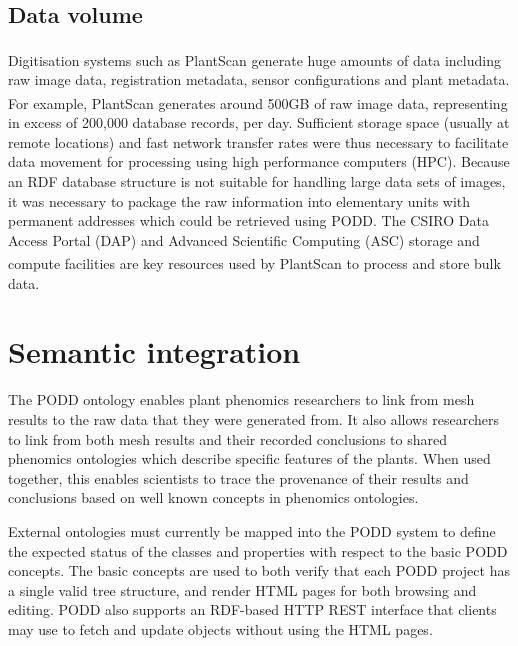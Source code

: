 \documentclass{llncs}
\begin{document}
\subsection{Data volume}
Digitisation systems such as PlantScan\textsuperscript{\texttrademark} generate
huge amounts of data including
raw image data, registration metadata, sensor configurations and plant metadata.
For example, PlantScan\textsuperscript{\texttrademark} generates around 500GB of
raw image data, representing
in excess of 200,000 database records, per day. Sufficient storage space
(usually at remote locations) and fast network transfer rates were thus
necessary to facilitate data movement for processing using high performance
computers (HPC). Because an RDF database structure is not suitable for handling
large data sets of images, it was necessary to package the raw information into
elementary units with permanent addresses which could be retrieved using PODD. 
The CSIRO Data Access Portal (DAP) \cite{DAP} and Advanced
Scientific Computing (ASC) storage and compute facilities \cite{ASC} are key
resources used by PlantScan\textsuperscript{\texttrademark} to
process and store bulk data.






\section{Semantic integration}
The PODD ontology enables plant phenomics researchers to link from mesh results
to the raw data that they were generated from. It also allows researchers to
link from both mesh results and their recorded conclusions to shared phenomics
ontologies which describe specific features of the plants. When used together,
this enables scientists to trace the provenance of their results and conclusions
based on well known concepts in phenomics ontologies.




External ontologies must currently be mapped into the PODD system to define the
expected status of the classes and properties with respect to the basic PODD
concepts. The basic concepts are used to both verify that each PODD project has
a single valid tree structure, and render HTML pages for both browsing and
editing. PODD also supports an RDF-based HTTP REST interface that clients may
use to fetch and update objects without using the HTML pages.
\end{document}
